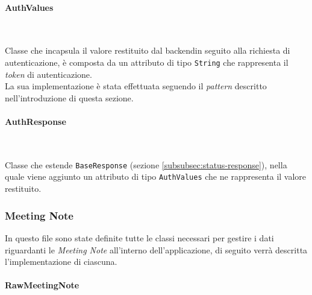 \paragraph*{AuthValues} ~ \\
\label{par:auth-values}

\noindent Classe che incapsula il valore restituito dal \gls{backend}\glsoccur in seguito alla richiesta di autenticazione, è composta da un attributo di tipo \lstinline{String} che rappresenta il \emph{token} di autenticazione.\\
La sua implementazione è stata effettuata seguendo il \emph{pattern} descritto nell'introduzione di questa sezione.

\paragraph*{AuthResponse} ~ \\
\label{par:auth-response}

\noindent Classe che estende \lstinline{BaseResponse} (sezione \ref{subsubsec:status-response}), nella quale viene aggiunto un attributo di tipo \lstinline{AuthValues} che ne rappresenta il valore restituito.

\subsubsection*{Meeting Note}
\label{subsubsec:meeting-note}

In questo file sono state definite tutte le classi necessari per gestire i dati riguardanti le \emph{Meeting Note} all'interno dell'applicazione, di seguito verrà descritta l'implementazione di ciascuna.

\paragraph*{RawMeetingNote} ~ \\
\label{par:raw-meeting-note}

